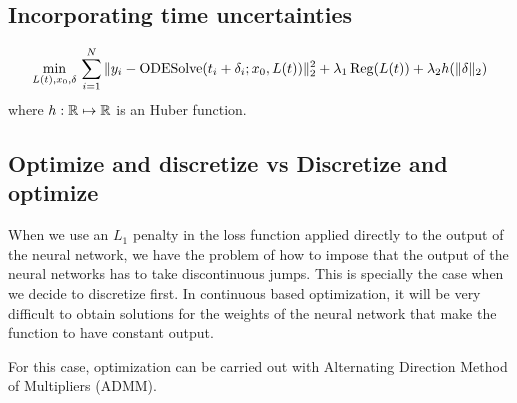 \subsection{Incorporating time uncertainties}

\begin{equation}
 \min_{L(t), x_0, \delta} \,
 \sum_{i=1}^N \| y_i - \operatorname{\text{ODESolve}} (t_i + \delta_i; x_0, L(t)) \|_2^2
 + 
 \lambda_1 
 \operatorname{\text{Reg}} (L(t))
 + 
 \lambda_2 
 h(\| \delta \|_2)
\end{equation}
where $h:\operatorname{\mathbb{R}} \mapsto \operatorname{\mathbb{R}}$ is an Huber function.

\subsection{Optimize and discretize vs Discretize and optimize}


When we use an $L_1$ penalty in the loss function applied directly to the output of the neural network, we have the problem  of how to impose that the output of the neural networks has to take discontinuous jumps.
This is specially the case when we decide to discretize first. 
In continuous based optimization, it will be very difficult to obtain solutions for the weights of the neural network that make the function to have constant output. 

For this case, optimization can be carried out with Alternating Direction Method of Multipliers (ADMM).